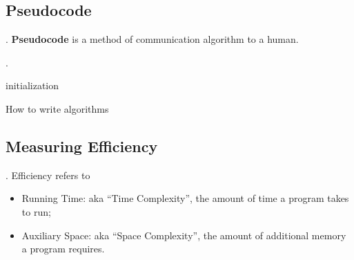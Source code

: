 \documentclass{article}
\begin{document}
\subsection{Pseudocode}

\begin{deff}.
    \textbf{Pseudocode} is a method of communication algorithm to a human. 
\end{deff}

\begin{exampleee}.
    
\end{exampleee}

\begin{algorithm}[H]   initialization\;  \caption{How to write algorithms} \end{algorithm}

\subsection{Measuring Efficiency} 

\begin{deff}.
    Efficiency refers to \begin{itemize}
        \item Running Time: aka  ``Time Complexity'', the amount of time a program takes to run; 
        \item Auxiliary Space: aka ``Space Complexity'', the amount of additional memory a program requires. 
    \end{itemize} 
\end{deff}
\end{document}
